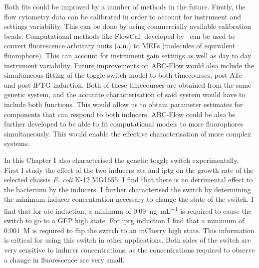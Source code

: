 Both fits could be improved by a number of methods in the future. Firstly, the flow cytometry data can be calibrated in order to account for instrument and settings variability. This can be done by using commercially available calibration beads. Computational methods like FlowCal, developed by~\textcite{Tabor:2009bz} can be used to convert fluorescence arbitrary units (a.u.) to MEFs (molecules of equivalent fluorophore). This can account for instrument gain settings as well as day to day instrument variability. Future improvements on ABC-Flow would also include the simultaneous fitting of the toggle switch model to both timecourses, post ATc and post IPTG induction. Both of these timecourses are obtained from the same genetic system, and the accurate characterisation of said system would have to include both functions. This would allow us to obtain parameter estimates for components that can respond to both inducers. ABC-Flow could be also be further developed to be able to fit computational models to more fluorophores simultaneously. This would enable the effective characterisation of more complex systems.


In this Chapter I also characterised the genetic toggle switch experimentally. First I study the effect of the two inducers \acrshort{atc} and \acrshort{iptg} on the growth rate of the selected chassis \textit{E. coli} K-12 MG1655. I find that there is no detrimental effect to the bacterium by the inducers. I further characterised the switch by determining the minimum inducer concentration necessary to change the state of the switch. I find that for \acrshort{atc} induction, a minimum of \SI{0.09}{\nano\gram\per\milli\liter} is required to cause the switch to go to a GFP high state. For \acrshort{iptg} induction I find that a minimum of \SI{0.001}{M} is required to flip the switch to an mCherry high state. This information is critical for using this switch in other applications. Both sides of the switch are very sensitive to inducer concentrations, as the concentrations required to observe a change in fluorescence are very small. 





